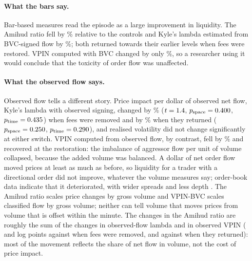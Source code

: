\begin{table}[t]
\centering\caption{Trade-level composition of volume around the fee switches}\label{tab:forensics}
\resizebox{\textwidth}{!}{}
\end{table}

\paragraph{What the bars say.} Bar-based measures read the episode as a large improvement in
liquidity. The Amihud ratio fell by \feeOnAmihudPctA\% relative to the controls and Kyle's lambda
estimated from BVC-signed flow by \feeOnLamBvcPctA\%; both returned towards their earlier levels when
fees were restored. VPIN computed with BVC changed by only \feeOnVpinBvcPct\%, so a researcher using
it would conclude that the toxicity of order flow was unaffected.

\paragraph{What the observed flow says.} Observed flow tells a different story. Price impact per
dollar of observed net flow, Kyle's lambda with observed signing, changed by \feeOnLamTruePct\%
($t=1.4$, $p_{\text{space}}=0.400$, $p_{\text{time}}=0.435$) when
fees were removed and by \feeOffLamTruePct\% when they returned ($p_{\text{space}}=0.250$,
$p_{\text{time}}=0.290$), and realised volatility did not change significantly at either
switch. VPIN computed from observed flow, by contrast, fell by \feeOnVpinTruePctA\% and recovered at
the restoration: the imbalance of aggressor flow per unit of volume collapsed, because the added
volume was balanced. A dollar of net order flow moved prices at least as much as before, so liquidity
for a trader with a directional order did not improve, whatever the volume measures say; order-book
data indicate that it deteriorated, with wider spreads and less depth \citep{galati2024}. The Amihud
ratio scales price changes by gross volume and VPIN-BVC scales classified flow by gross volume;
neither can tell volume that moves prices from volume that is offset within the minute. The changes
in the Amihud ratio are roughly the sum of the changes in observed-flow lambda and in observed VPIN
(\feeOnLamTrue{} and \feeOnVpinTrue{} log points against \feeOnAmihud{} when fees were removed,
\feeOffLamTrue{} and \feeOffVpinTrue{} against \feeOffAmihud{} when they returned): most of the
movement reflects the share of net flow in volume, not the cost of price impact.

